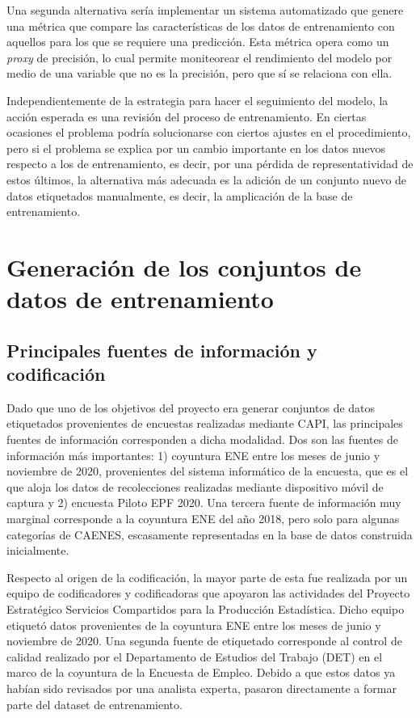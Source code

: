 \documentclass[
  12pt,
  spanish,
]{article}
\begin{document}
Una segunda alternativa sería implementar un sistema automatizado que
genere una métrica que compare las características de los datos de
entrenamiento con aquellos para los que se requiere una predicción. Esta
métrica opera como un \emph{proxy} de precisión, lo cual permite
moniteorear el rendimiento del modelo por medio de una variable que no
es la precisión, pero que sí se relaciona con ella.

Independientemente de la estrategia para hacer el seguimiento del
modelo, la acción esperada es una revisión del proceso de entrenamiento.
En ciertas ocasiones el problema podría solucionarse con ciertos ajustes
en el procedimiento, pero si el problema se explica por un cambio
importante en los datos nuevos respecto a los de entrenamiento, es
decir, por una pérdida de representatividad de estos últimos, la
alternativa más adecuada es la adición de un conjunto nuevo de datos
etiquetados manualmente, es decir, la amplicación de la base de
entrenamiento.

\hypertarget{generaciuxf3n-de-los-conjuntos-de-datos-de-entrenamiento}{%
\section{Generación de los conjuntos de datos de
entrenamiento}\label{generaciuxf3n-de-los-conjuntos-de-datos-de-entrenamiento}}

\hypertarget{principales-fuentes-de-informaciuxf3n-y-codificaciuxf3n}{%
\subsection{Principales fuentes de información y
codificación}\label{principales-fuentes-de-informaciuxf3n-y-codificaciuxf3n}}

Dado que uno de los objetivos del proyecto era generar conjuntos de
datos etiquetados provenientes de encuestas realizadas mediante CAPI,
las principales fuentes de información corresponden a dicha modalidad.
Dos son las fuentes de información más importantes: 1) coyuntura ENE
entre los meses de junio y noviembre de 2020, provenientes del sistema
informático de la encuesta, que es el que aloja los datos de
recolecciones realizadas mediante dispositivo móvil de captura y 2)
encuesta Piloto EPF 2020. Una tercera fuente de información muy marginal
corresponde a la coyuntura ENE del año 2018, pero solo para algunas
categorías de CAENES, escasamente representadas en la base de datos
construida inicialmente.

Respecto al origen de la codificación, la mayor parte de esta fue
realizada por un equipo de codificadores y codificadoras que apoyaron
las actividades del Proyecto Estratégico Servicios Compartidos para la
Producción Estadística. Dicho equipo etiquetó datos provenientes de la
coyuntura ENE entre los meses de junio y noviembre de 2020. Una segunda
fuente de etiquetado corresponde al control de calidad realizado por el
Departamento de Estudios del Trabajo (DET) en el marco de la coyuntura
de la Encuesta de Empleo. Debido a que estos datos ya habían sido
revisados por una analista experta, pasaron directamente a formar parte
del dataset de entrenamiento.
\end{document}
